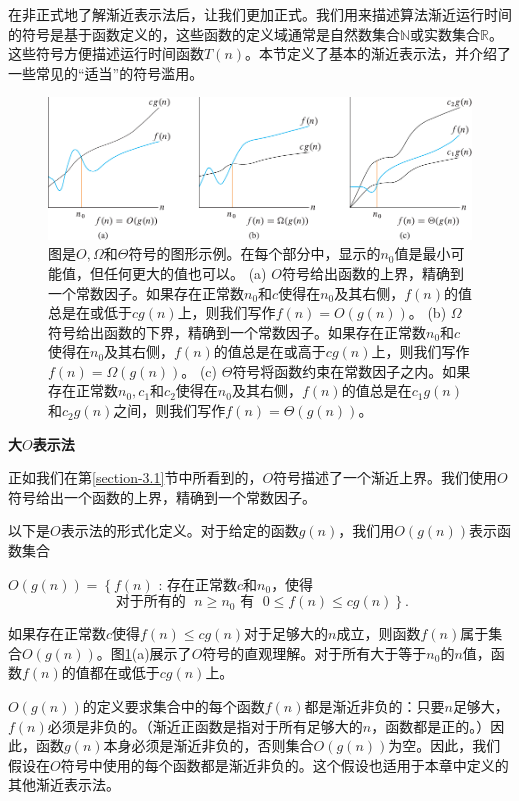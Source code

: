 \documentclass[lang=cn,newtx,10pt,scheme=chinese]{elegantbook}
\begin{document}
在非正式地了解渐近表示法后，让我们更加正式。我们用来描述算法渐近运行时间的符号是基于函数定义的，这些函数的定义域通常是自然数集合$\mathbb{N}$或实数集合$\mathbb{R}$。这些符号方便描述运行时间函数$T(n)$。本节定义了基本的渐近表示法，并介绍了一些常见的``适当''的符号滥用。

\begin{figure}
    \centering
    \includegraphics{算法导论第四版插图/第二章/渐近时间复杂度比较示意图.pdf}
    \caption{图是$O, \Omega$和$\Theta$符号的图形示例。在每个部分中，显示的$n_0$值是最小可能值，但任何更大的值也可以。 (a) $O$符号给出函数的上界，精确到一个常数因子。如果存在正常数$n_0$和$c$使得在$n_0$及其右侧，$f(n)$的值总是在或低于$cg(n)$上，则我们写作$f(n)=O(g(n))$。 (b) $\Omega$符号给出函数的下界，精确到一个常数因子。如果存在正常数$n_0$和$c$使得在$n_0$及其右侧，$f(n)$的值总是在或高于$cg(n)$上，则我们写作$f(n)=\Omega(g(n))$。 (c) $\Theta$符号将函数约束在常数因子之内。如果存在正常数$n_0,c_1$和$c_2$使得在$n_0$及其右侧，$f(n)$的值总是在$c_1g(n)$和$c_2g(n)$之间，则我们写作$f(n)=\Theta(g(n))$。}
    \label{fig:渐近时间复杂度比较示意图}
\end{figure}

\textbf{大$O$表示法}

正如我们在第\ref{section-3.1}节中所看到的，$O$符号描述了一个渐近上界。我们使用$O$符号给出一个函数的上界，精确到一个常数因子。

以下是$O$表示法的形式化定义。对于给定的函数$g(n)$，我们用$O(g(n))$表示函数集合

$O(g(n))=\left\{f(n)\right.$ : 存在正常数$c$和$n_0$，使得
$$
\text { 对于所有的 }\; n \geq n_0 \text { 有 } \;
\left.0 \leq f(n) \leq c g(n) \right\} .
$$

如果存在正常数$c$使得$f(n) \leq c g(n)$对于足够大的$n$成立，则函数$f(n)$属于集合$O(g(n))$。图\ref{fig:渐近时间复杂度比较示意图}(a)展示了$O$符号的直观理解。对于所有大于等于$n_0$的$n$值，函数$f(n)$的值都在或低于$cg(n)$上。

$O(g(n))$的定义要求集合中的每个函数$f(n)$都是渐近非负的：只要$n$足够大，$f(n)$必须是非负的。（渐近正函数是指对于所有足够大的$n$，函数都是正的。）因此，函数$g(n)$本身必须是渐近非负的，否则集合$O(g(n))$为空。因此，我们假设在$O$符号中使用的每个函数都是渐近非负的。这个假设也适用于本章中定义的其他渐近表示法。
\end{document}
